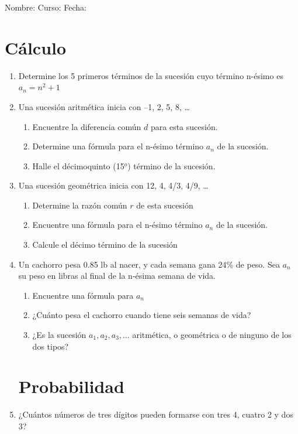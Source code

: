 \documentclass[fleqn]{article}
\newcommand{\LineaNombre}{%
\par
\vspace{\baselineskip}
Nombre:\hrulefill \; Curso: \underline{\hspace*{48pt}} \; Fecha: \underline{\hspace*{2.5cm}} \relax
\par}
\begin{document}
\LineaNombre
\section*{Cálculo}
\begin{enumerate}
 \item Determine los 5 primeros términos de la sucesión cuyo término n-ésimo es $a_{n}=n^{2}+1$
 \begin{enumerate}
 \end{enumerate}
 \item Una sucesión aritmética inicia con --1, 2, 5, 8, \ldots
 \begin{enumerate}
 \item Encuentre la diferencia común $d$ para esta sucesión.\noanswer
\item Determine una fórmula para el n-ésimo término $a_{n}$ de la sucesión.\noanswer
\item Halle el décimoquinto (15$^{o}$) término de la sucesión.\noanswer
 \end{enumerate}
 \item Una sucesión geométrica inicia con 12, 4, 4/3, 4/9, \ldots
 \begin{enumerate}
\item Determine la razón común $r$ de esta sucesión \noanswer
 \newpage
\item Encuentre una fórmula para el n-ésimo término $a_{n}$ de la sucesión.\noanswer
\item Calcule el décimo término de la sucesión\noanswer
\end{enumerate}
\item Un cachorro pesa 0.85 lb al nacer, y cada semana gana 24\% de peso. Sea $a_{n}$ su peso en libras al final de la n-ésima semana de vida.
\begin{enumerate}
\item Encuentre una fórmula para $a_{n}$\noanswer
\item ¿Cuánto pesa el cachorro cuando tiene seis semanas de vida?\noanswer
\item ¿Es la sucesión $a_{1},a_{2},a_{3},\ldots$ aritmética, o geométrica o de ninguno de los dos tipos? \noanswer
\end{enumerate}
\section*{Probabilidad}
\item ¿Cuántos números de tres dígitos pueden formarse con tres 4, cuatro 2 y dos 3?\noanswer
 \end{enumerate}
\end{document}
